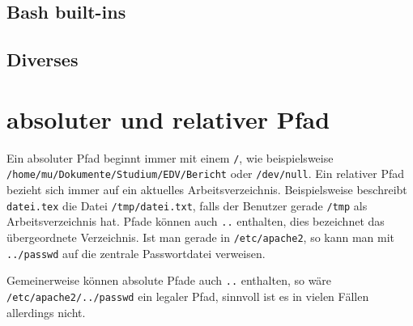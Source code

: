 \subsection{Bash built-ins}
\begin{itemize}
\end{itemize}

\subsection{Diverses}
\begin{itemize}
\end{itemize}

\section{absoluter und relativer Pfad}

Ein absoluter Pfad beginnt immer mit einem \texttt{/}, wie beispielsweise \\ \texttt{/home/mu/Dokumente/Studium/EDV/Bericht} oder \texttt{/dev/null}. Ein relativer Pfad bezieht sich immer auf ein aktuelles Arbeitsverzeichnis. Beispielsweise beschreibt \texttt{datei.tex} die Datei \texttt{/tmp/datei.txt}, falls der Benutzer gerade \texttt{/tmp} als Arbeitsverzeichnis hat. Pfade können auch \texttt{..} enthalten, dies bezeichnet das übergeordnete Verzeichnis. Ist man gerade in \texttt{/etc/apache2}, so kann man mit \texttt{../passwd} auf die zentrale Passwortdatei verweisen.

Gemeinerweise können absolute Pfade auch \texttt{..} enthalten, so wäre \\
\texttt{/etc/apache2/../passwd} ein legaler Pfad, sinnvoll ist es in vielen Fällen allerdings nicht.


